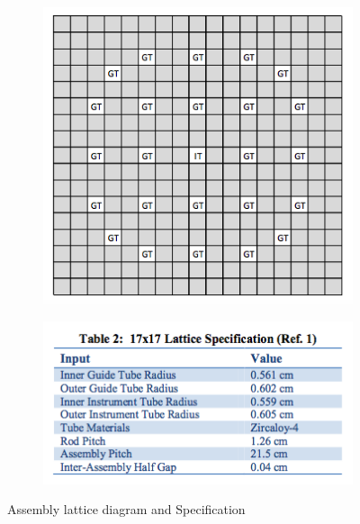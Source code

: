 \documentclass[12pt]{article}
\begin{document}
\begin{figure} [htb!]
\centering
\begin{subfigure}{.5\textwidth}
  \includegraphics[scale=0.5]{Figures/Assembly Geometry 1.png}
  \label{fig:sub1}
\end{subfigure}%
\begin{subfigure}{.5\textwidth}
  \includegraphics[scale=0.7]{Figures/Assembly Specs.png}
  \label{fig:sub2}
\end{subfigure}
\caption{Assembly lattice diagram and Specification}
\label{fig:test}
\end{figure}
\end{document}
